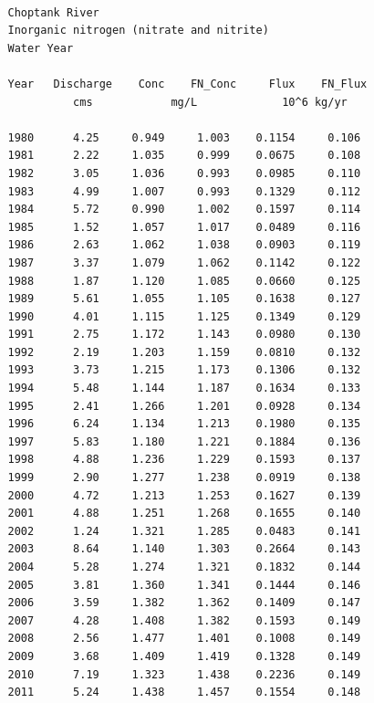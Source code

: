 \documentclass[a4paper,11pt]{article}\usepackage{graphicx, color}
\makeatletter
\newenvironment{kframe}{%
 \def\at@end@of@kframe{}%
 \ifinner\ifhmode%
  \def\at@end@of@kframe{\end{minipage}}%
  \begin{minipage}{\columnwidth}%
 \fi\fi%
 \def\FrameCommand##1{\hskip\@totalleftmargin \hskip-\fboxsep
 \colorbox{shadecolor}{##1}\hskip-\fboxsep
     \hskip-\linewidth \hskip-\@totalleftmargin \hskip\columnwidth}%
 \MakeFramed {\advance\hsize-\width
   \@totalleftmargin\z@ \linewidth\hsize
   \@setminipage}}%
 {\par\unskip\endMakeFramed%
 \at@end@of@kframe}
\newenvironment{knitrout}{}{} %
\makeatother
\begin{document}
\begin{knitrout}
\color{fgcolor}\begin{kframe}
\begin{verbatim}

   Choptank River 
   Inorganic nitrogen (nitrate and nitrite)
   Water Year 

   Year   Discharge    Conc    FN_Conc     Flux    FN_Flux
             cms            mg/L             10^6 kg/yr 

   1980      4.25     0.949     1.003    0.1154     0.106
   1981      2.22     1.035     0.999    0.0675     0.108
   1982      3.05     1.036     0.993    0.0985     0.110
   1983      4.99     1.007     0.993    0.1329     0.112
   1984      5.72     0.990     1.002    0.1597     0.114
   1985      1.52     1.057     1.017    0.0489     0.116
   1986      2.63     1.062     1.038    0.0903     0.119
   1987      3.37     1.079     1.062    0.1142     0.122
   1988      1.87     1.120     1.085    0.0660     0.125
   1989      5.61     1.055     1.105    0.1638     0.127
   1990      4.01     1.115     1.125    0.1349     0.129
   1991      2.75     1.172     1.143    0.0980     0.130
   1992      2.19     1.203     1.159    0.0810     0.132
   1993      3.73     1.215     1.173    0.1306     0.132
   1994      5.48     1.144     1.187    0.1634     0.133
   1995      2.41     1.266     1.201    0.0928     0.134
   1996      6.24     1.134     1.213    0.1980     0.135
   1997      5.83     1.180     1.221    0.1884     0.136
   1998      4.88     1.236     1.229    0.1593     0.137
   1999      2.90     1.277     1.238    0.0919     0.138
   2000      4.72     1.213     1.253    0.1627     0.139
   2001      4.88     1.251     1.268    0.1655     0.140
   2002      1.24     1.321     1.285    0.0483     0.141
   2003      8.64     1.140     1.303    0.2664     0.143
   2004      5.28     1.274     1.321    0.1832     0.144
   2005      3.81     1.360     1.341    0.1444     0.146
   2006      3.59     1.382     1.362    0.1409     0.147
   2007      4.28     1.408     1.382    0.1593     0.149
   2008      2.56     1.477     1.401    0.1008     0.149
   2009      3.68     1.409     1.419    0.1328     0.149
   2010      7.19     1.323     1.438    0.2236     0.149
   2011      5.24     1.438     1.457    0.1554     0.148
\end{verbatim}
\end{kframe}
\end{knitrout}
\end{document}
